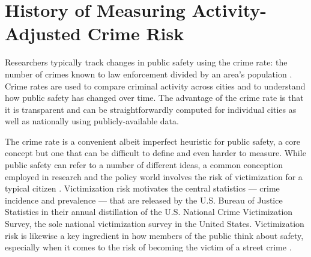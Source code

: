\newpage
\clearpage
\appendix



\singlespacing
\section{History of Measuring Activity-Adjusted Crime Risk} \label{sec:appendixA}
Researchers typically track changes in public safety using the crime rate: the number of crimes known to law enforcement divided by an area's population \citep{nolan2004establishing}. Crime rates are used to compare criminal activity across cities and to understand how public safety has changed over time. The advantage of the crime rate is that it is transparent and can be straightforwardly computed for individual cities as well as nationally using publicly-available data. 

The crime rate is a convenient albeit imperfect heuristic for public safety, a core concept but one that can be difficult to define and even harder to measure. While public safety can refer to a number of different ideas, a common conception employed in research and the policy world involves the risk of victimization for a typical citizen \citep{boggs1965urban, stipak1988alternatives, vaughan2020promise, ramos2021improving}. Victimization risk motivates the central statistics --- crime incidence and prevalence --- that are released by the U.S. Bureau of Justice Statistics in their annual distillation of the U.S. National Crime Victimization Survey, the sole national victimization survey in the United States. Victimization risk is likewise a key ingredient in how members of the public think about safety, especially when it comes to the risk of becoming the victim of a street crime \citep{ferraro1995fear, pickett2012reconsidering}.

